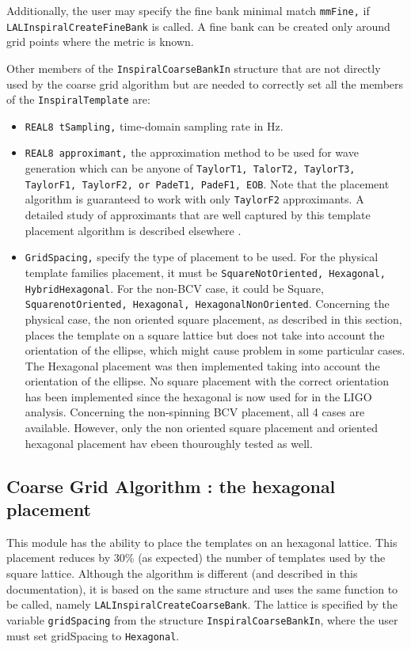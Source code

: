 Additionally, the user may specify the fine bank minimal match
\texttt{mmFine,} if \texttt{LALInspiralCreateFineBank} is called.
A fine bank can be created only around grid points where the
metric is known.

Other members of the \texttt{InspiralCoarseBankIn} structure that
are not directly used by the coarse grid algorithm but are needed to
correctly set all the members of the \texttt{InspiralTemplate} are:

\begin{itemize}
\item \texttt {REAL8 tSampling,} time-domain sampling rate in Hz.
\item \texttt {REAL8 approximant,} the approximation method to be used
for wave generation which can be anyone of \texttt{TaylorT1, TalorT2,
TaylorT3, TaylorF1, TaylorF2, {\rm or} PadeT1, PadeF1, EOB}. Note that
the placement algorithm is guaranteed to work with only \texttt {TaylorF2}
approximants. A detailed study of approximants that are well captured by
this template placement algorithm is described elsewhere \cite{Sathyaprakash
2001a}.
\item \texttt {GridSpacing,} specify the type of placement to be used. For the
physical template families placement, it must be \texttt{SquareNotOriented,
Hexagonal, HybridHexagonal}. For the non-BCV case, it could be Square,
\texttt{SquarenotOriented, Hexagonal, HexagonalNonOriented}. Concerning
the physical case, the non oriented square placement, as described in this
section, places the template on a square lattice but does not take into
account the orientation of the ellipse, which might cause problem in some
particular cases. The Hexagonal placement was then implemented taking  into
account the orientation of the ellipse. No square placement with the correct
orientation has been implemented since the hexagonal is now used for in the
LIGO analysis. Concerning the non-spinning BCV placement, all 4 cases are
available. However, only the non oriented square placement and oriented
hexagonal placement hav ebeen thouroughly tested as well. 

\end{itemize}

\subsection{Coarse Grid Algorithm : the hexagonal placement}
This module has the ability to place the templates on an hexagonal lattice.
This placement reduces by 30\% (as expected) the number of templates used by
the square lattice. Although the algorithm is different (and described in this
documentation), it is based on the same structure and uses the same function
to be called, namely \texttt{LALInspiralCreateCoarseBank}. The lattice is
specified by the variable \texttt{gridSpacing} from the structure \texttt{InspiralCoarseBankIn}, where
the user must set gridSpacing to \texttt{Hexagonal}. 

